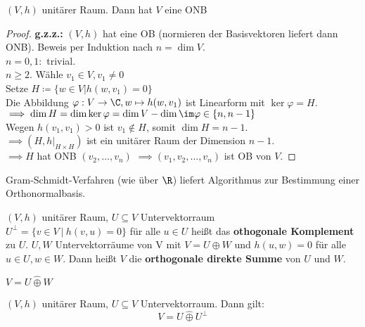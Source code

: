\documentclass{article}
\begin{document}
    \begin{satz}
        \label{existenz_onb}
        $(V, h)$ unitärer Raum. Dann hat $V$ eine ONB
    \end{satz}
    \begin{proof}
        \textbf{g.z.z.:} $(V,h)$ hat eine OB (normieren der Basisvektoren liefert dann ONB).
        Beweis per Induktion nach $n = \dim V$.\\
        $n = 0, 1:$ trivial.\\
        $n \geq 2$. Wähle $v_1 \in V, v_1 \neq 0$\\
        Setze $H \coloneqq \{w \in V | h(w, v_1) = 0\}$\\
        Die Abbildung $\varphi : V \to \C, w\mapsto h(w, v_1)$ ist Linearform mit $\ker \varphi = H$.\\
        $\implies \dim H = \dim \ker \varphi = \dim V - \dim \im \varphi \in \{n, n-1\}$\\
        Wegen $h(v_1, v_1) > 0$ ist $v_1 \notin H$, somit $\dim H = n-1$.\\
        $\implies (H, h|_{H\times H})$ ist ein unitärer Raum der Dimension $n-1$.\\
        $\implies H$ hat ONB $(v_2, \dots, v_n)$
        $\implies (v_1, v_2, \dots, v_n)$ ist OB von $V$.
    \end{proof}
    \begin{anmerkung}
        Gram-Schmidt-Verfahren (wie über $\R$) liefert Algorithmus zur Bestimmung einer Orthonormalbasis.
    \end{anmerkung}
    \begin{definition}
        $(V, h)$ unitärer Raum, $U\subseteq V$ Untervektorraum\\
        $U^\perp = \{v\in V\ |\ h(v,u) = 0\}$ für alle $u\in U$ heißt das \textbf{othogonale Komplement} zu $U$.
        $U, W$ Untervektorräume von V mit $V = U \oplus W$ und $h(u, w) = 0$ für alle $u\in U, w \in W$.
        Dann heißt $V$ die \textbf{orthogonale direkte Summe} von $U$ und $W$.
        \begin{notatio}
            $V = U\hat{\oplus} W$
        \end{notatio}
    \end{definition}
    \begin{satz}
        $(V,h)$ unitärer Raum, $U\subseteq V$ Untervektorraum. Dann gilt:
        $$V = U\hat{\oplus} U^\perp$$
    \end{satz}
\end{document}
